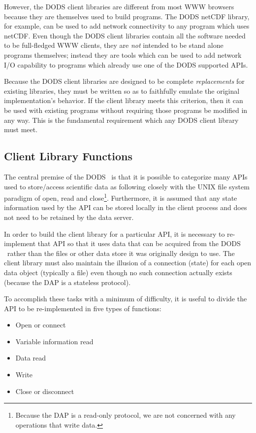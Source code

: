 However, the DODS client libraries are different from most WWW browsers
because they are themselves used to build programs. The DODS netCDF library,
for example, can be used to add network connectivity to any program which
uses netCDF\@. Even though the DODS client libraries contain all the software
needed to be full-fledged WWW clients, they are {\em not\/} intended to be
stand alone programs themselves; instead they are tools which can be used to
add network I/O capability to programs which already use one of the DODS
supported APIs. 

Because the DODS client libraries are designed to be complete {\em
  replacements\/} for existing libraries, they must be written so as to
faithfully emulate the original implementation's behavior. If the client
library meets this criterion, then it can be used with existing programs
without requiring those programs be modified in any way. This is the
fundamental requirement which any DODS client library must meet.

\subsection{Client Library Functions}

The central premise of the DODS \dda\ is that it is possible to categorize
many APIs used to store/access scientific data as following closely with the
UNIX file system paradigm of open, read and close\footnote{Because the DAP is
  a read-only protocol, we are not concerned with any operations that write
  data.}. Furthermore, it is assumed that any state information used by the
API can be stored locally in the client process and does not need to be
retained by the data server.

In order to build the client library for a particular API, it is necessary to
re-implement that API so that it uses data that can be acquired from the DODS
\dap\ rather than the files or other data store it was originally design to
use. The client library must also maintain the illusion of a connection
(state) for each open data object (typically a file) even though no such
connection actually exists (because the DAP is a stateless protocol). 

To accomplish these tasks with a minimum of difficulty, it is useful to divide
the API to be re-implemented in five types of functions:
\begin{itemize}
\item Open or connect
\item Variable information read
\item Data read
\item Write 
\item Close or disconnect
\end{itemize}

